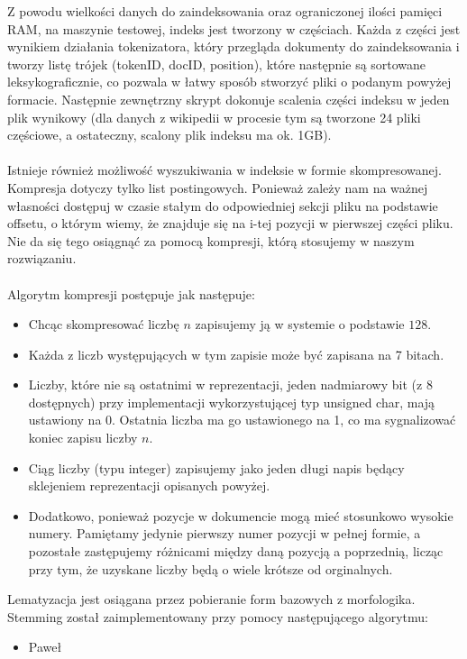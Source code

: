 \documentclass[11pt,leqno]{article}
\begin{document}
Z powodu wielkości danych do zaindeksowania oraz ograniczonej ilości pamięci RAM, na maszynie testowej, indeks jest tworzony w częściach. Każda z części jest wynikiem działania tokenizatora, który przegląda dokumenty do zaindeksowania i tworzy listę trójek (tokenID, docID, position), które następnie są sortowane leksykograficznie, co pozwala w łatwy sposób stworzyć pliki o podanym powyżej formacie. Następnie zewnętrzny skrypt dokonuje scalenia części indeksu w jeden plik wynikowy (dla danych z wikipedii w procesie tym są tworzone 24 pliki częściowe, a ostateczny, scalony plik indeksu ma ok. 1GB).\\\\
Istnieje również możliwość wyszukiwania w indeksie w formie skompresowanej. Kompresja dotyczy tylko list postingowych. Ponieważ zależy nam na ważnej własności dostępuj w czasie stałym do odpowiedniej sekcji pliku na podstawie offsetu, o którym wiemy, że znajduje się na i-tej pozycji w pierwszej części pliku. Nie da się tego osiągnąć za pomocą kompresji, którą stosujemy w naszym rozwiązaniu.\\\\
Algorytm kompresji postępuje jak następuje:
\begin{itemize}
\item Chcąc skompresować liczbę $n$ zapisujemy ją w systemie o podstawie $128$.
\item Każda z liczb występujących w tym zapisie może być zapisana na 7 bitach.
\item Liczby, które nie są ostatnimi w reprezentacji, jeden nadmiarowy bit (z 8 dostępnych) przy implementacji wykorzystującej typ unsigned char, mają ustawiony na 0. Ostatnia liczba ma go ustawionego na 1, co ma sygnalizować koniec zapisu liczby $n$.
\item Ciąg liczby (typu integer) zapisujemy jako jeden długi napis będący sklejeniem reprezentacji opisanych powyżej.
\item Dodatkowo, ponieważ pozycje w dokumencie mogą mieć stosunkowo wysokie numery. Pamiętamy jedynie pierwszy numer pozycji w pełnej formie, a pozostałe zastępujemy różnicami między daną pozycją a poprzednią, licząc przy tym, że uzyskane liczby będą o wiele krótsze od orginalnych.
\end{itemize} 

Lematyzacja jest osiągana przez pobieranie form bazowych z morfologika. Stemming został zaimplementowany przy pomocy następującego algorytmu:

\begin{itemize}
\item Paweł
\end{itemize}
\end{document}

